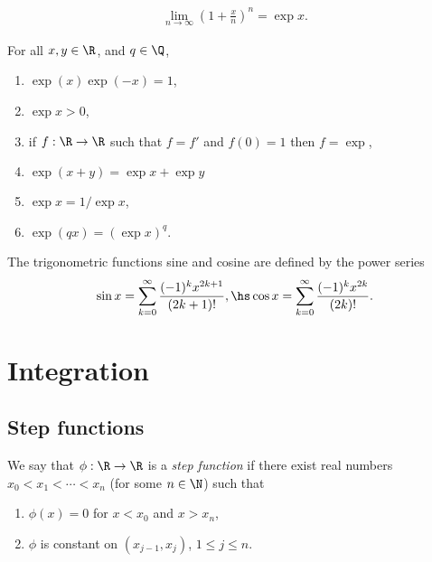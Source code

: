\documentclass{article}
\begin{document}
\begin{corollary*}
	\begin{align*}
		\lim_{n\to\infty}\left(1+\frac{x}{n}\right)^n = \exp x.
	\end{align*}
\end{corollary*}

\begin{theorem}
	For all $x,y\in\R$, and $q\in\Q$,
	\begin{enumerate}
		\item $\exp(x)\exp(-x)=1$,
		\item $\exp x > 0$,
		\item if $f:\R\to\R$ such that $f=f'$ and $f(0)=1$ then $f=\exp$,
		\item $\exp(x+y)=\exp x + \exp y$
		\item $\exp x = 1/\exp x$,
		\item $\exp (qx) = (\exp x)^q$.
	\end{enumerate}
\end{theorem}

\begin{definition}
	The trigonometric functions sine and cosine are defined by the power series
	\begin{align*}
		\sin x = \sum_{k=0}^\infty \frac{(-1)^k x^{2k+1}}{(2k+1)!},\hs
		\cos x = \sum_{k=0}^\infty \frac{(-1)^k x^{2k}}{(2k)!}.
	\end{align*}
\end{definition}

\section{Integration}

\subsection{Step functions}

\begin{definition}
	We say that $\phi:\R\to\R$ is a \emph{step function} if there exist real numbers
	$x_0<x_1<\cdots < x_n$ (for some $n\in\N$) such that
	\begin{enumerate}
		\item $\phi(x)=0$ for $x<x_0$ and $x>x_n$,
		\item $\phi$ is constant on $(x_{j-1}, x_j)$, $1\leq j\leq n$.
	\end{enumerate}
\end{definition}
\end{document}
